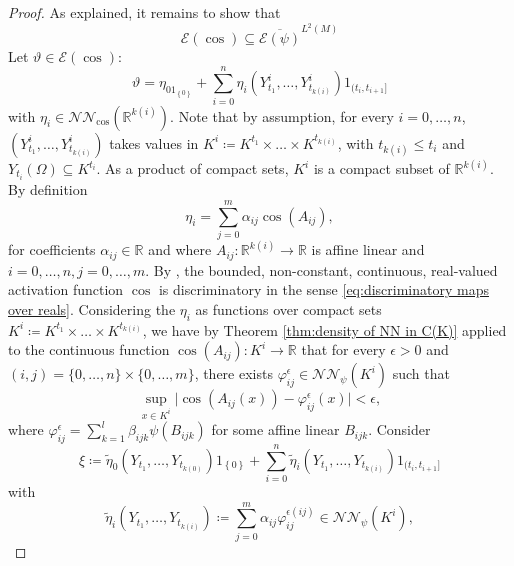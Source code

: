 \documentclass[11pt,a4paper,twoside,openany]{report}
\numberwithin{equation}{section}
\theoremstyle{plain} %
\theoremstyle{definition} %
\theoremstyle{remark} %
\let\parencite\authnumparencite
\begin{document}
\begin{proof}
As explained, it remains to show that 
    \begin{equation*}
    \mathcal{E}(\cos)\subseteq \overline{\mathcal{E}(\psi)}^{L^2(M)}
\end{equation*}
Let \(\vartheta\in\mathcal{E}(\cos)\):
\begin{equation*}
    \vartheta = \eta_01_{\left\{0\right\}}+\sum_{i=0}^n \eta_i(Y_{t_1}^i,\dots,Y_{t_{k(i)}}^i)1_{(t_i,t_{i+1}]}
\end{equation*}
with \(\eta_i\in\mathcal{NN}_{\cos}(\mathbb{R}^{k(i)})\). Note that by assumption, for every \(i=0,\dots,n\), \((Y_{t_1}^i,\dots,Y_{t_{k(i)}}^i)\) takes values in \(K^i\coloneqq K^{t_1}\times\dots\times K^{t_{k(i)}}\), with \(t_{k(i)}\leq t_i\) and \(Y_{t_i}(\Omega)\subseteq K^{t_i}\). As a product of compact sets, \(K^i\) is a compact subset of \(\mathbb{R}^{k(i)}\). By definition 
\begin{equation*}
    \eta_i=\sum_{j=0}^m\alpha_{ij}\cos(A_{ij}),
\end{equation*}
for coefficients \(\alpha_{ij}\in\mathbb{R}\) and
where \(A_{ij}:\mathbb{R}^{k(i)}\to\mathbb{R}\) is affine linear and \(i=0,\dots,n,j=0,\dots,m\).
By \parencite[Thm.~5]{Hornik1991}, the bounded, non-constant, continuous, real-valued activation function \(\cos\) is discriminatory in the sense \eqref{eq:discriminatory maps over reals}. Considering the \(\eta_i\) as functions over compact sets \(K^i\coloneqq K^{t_1}\times\dots\times K^{t_{k(i)}}\), we have by Theorem \ref{thm:density of NN in C(K)} applied to the continuous function \(\cos(A_{ij}):K^i\to\mathbb{R}\) that for every \(\epsilon>0\) and \((i,j)=\{0,\dots,n\}\times\{0,\dots,m\}\), there exists \(\varphi_{ij}^{\epsilon}\in\mathcal{NN}_{\psi}(K^i)\) such that 
\begin{equation*}
    \sup_{x\in K^i}\big|\cos(A_{ij}(x))-\varphi_{ij}^{\epsilon}(x)\big|<\epsilon,
\end{equation*}
where \(\varphi_{ij}^{\epsilon}=\sum_{k=1}^l\beta_{ijk}\psi(B_{ijk})\) for some affine linear \(B_{ijk}\). Consider
\begin{equation*}
    \xi \coloneqq \widetilde{\eta}_0(Y_{t_1},\dots,Y_{t_{k(0)}})1_{\left\{ 0\right\}}+\sum_{i=0}^n\widetilde{\eta}_i(Y_{t_1},\dots,Y_{t_{k(i)}})1_{(t_i,t_{i+1}]}
\end{equation*}
with
\begin{equation*}
    \widetilde{\eta}_i(Y_{t_1},\dots,Y_{t_{k(i)}})\coloneqq\sum_{j=0}^m\alpha_{ij}\varphi_{ij}^{\epsilon(ij)}\in \mathcal{NN}_{\psi}(K^i),

\end{equation*}
\end{proof}
\end{document}
